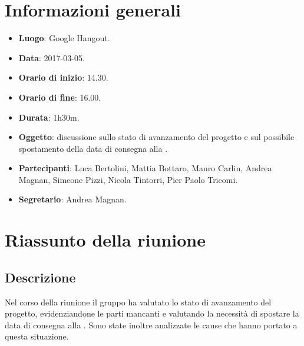 \documentclass[a4paper,titlepage]{article}
\begin{document}
\maketitle
\begin{diario}
\end{diario}
\newpage
\tableofcontents

\newpage
\section{Informazioni generali}
\label{sec:Informazioni}

\begin{itemize}
  \item \textbf{Luogo}: Google Hangout.
  \item \textbf{Data}: 2017-03-05.
  \item \textbf{Orario di inizio}: 14.30.
  \item \textbf{Orario di fine}: 16.00.
  \item \textbf{Durata}: 1h30m.
  \item \textbf{Oggetto}: discussione sullo stato di avanzamento del progetto e sul possibile spostamento della data di consegna alla \RP{}.
  \item \textbf{Partecipanti}: Luca Bertolini, Mattia Bottaro, Mauro Carlin, Andrea Magnan, Simeone Pizzi, Nicola Tintorri, Pier Paolo Tricomi.
  \item \textbf{Segretario}: Andrea Magnan.

\end{itemize}
\section{Riassunto della riunione}
\label{sec:RiassuntoRiunione}
 \subsection{Descrizione}
Nel corso della riunione il gruppo \GRUPPO{} ha valutato lo stato di avanzamento del progetto, evidenziandone le parti mancanti e valutando la necessità di spostare la data di consegna alla \RP{}. Sono state inoltre analizzate le cause che hanno portato a questa situazione.
\end{document}
